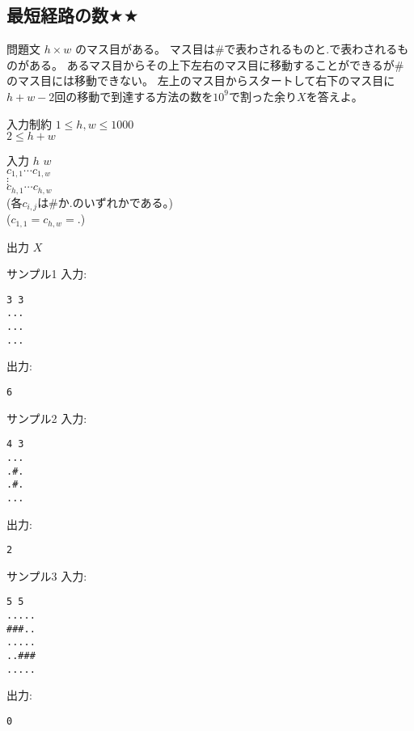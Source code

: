 \documentclass[a4paper,twoside,onecolumn,openany,article,10pt]{memoir}
\theoremstyle{remark}
\begin{document}
\clearpage
\subsection{最短経路の数$\bigstar\bigstar$}
\begin{itembox}[l]{問題文}
$h\times w$ のマス目がある。
マス目は\#で表わされるものと.で表わされるものがある。
あるマス目からその上下左右のマス目に移動することができるが\#のマス目には移動できない。
左上のマス目からスタートして右下のマス目に$h+w-2$回の移動で到達する方法の数を$10^9$で割った余り$X$を答えよ。
\end{itembox}

\begin{itembox}[l]{入力制約}
$1\le h, w\le 1000$\\
$2\le h+w$
\end{itembox}

\begin{itembox}[l]{入力}
$h$ $w$\\
$c_{1,1} \dotsb c_{1,w}$\\
$\vdots$\\
$c_{h,1} \dotsb c_{h,w}$\\
(各$c_{i,j}$は\#か.のいずれかである。)\\
($c_{1,1} = c_{h,w} = .$)
\end{itembox}

\begin{itembox}[l]{出力}
$X$
\end{itembox}

\noindent
\begin{minipage}[t]{0.33\hsize}
\begin{itembox}[l]{サンプル1}
入力:
\begin{verbatim}
3 3
...
...
...
\end{verbatim}
出力:
\begin{verbatim}
6
\end{verbatim}
\end{itembox}
\end{minipage}
\begin{minipage}[t]{0.33\hsize}
\begin{itembox}[l]{サンプル2}
入力:
\begin{verbatim}
4 3
...
.#.
.#.
...
\end{verbatim}
出力:
\begin{verbatim}
2
\end{verbatim}
\end{itembox}
\end{minipage}
\begin{minipage}[t]{0.33\hsize}
\begin{itembox}[l]{サンプル3}
入力:
\begin{verbatim}
5 5
.....
###..
.....
..###
.....
\end{verbatim}
出力:
\begin{verbatim}
0
\end{verbatim}
\end{itembox}
\end{minipage}
\end{document}
